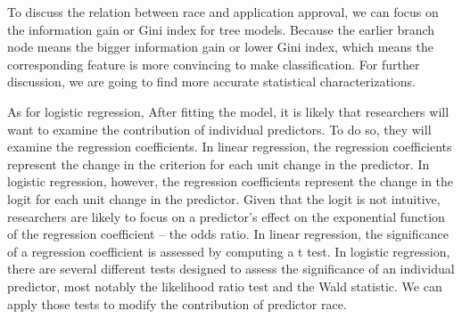 \documentclass[letterpaper, 10 pt, conference]{ieeeconf}  %
\begin{document}
To discuss the relation between race and application approval, we can focus on the information gain or Gini index for tree models. Because the earlier branch node means the bigger information gain or lower Gini index, which means the corresponding feature is more convincing to make classification. For further discussion, we are going to find more accurate statistical characterizations.

As for logistic regression, After fitting the model, it is likely that researchers will want to examine the contribution of individual predictors. To do so, they will examine the regression coefficients. In linear regression, the regression coefficients represent the change in the criterion for each unit change in the predictor. In logistic regression, however, the regression coefficients represent the change in the logit for each unit change in the predictor. Given that the logit is not intuitive, researchers are likely to focus on a predictor's effect on the exponential function of the regression coefficient – the odds ratio. In linear regression, the significance of a regression coefficient is assessed by computing a t test. In logistic regression, there are several different tests designed to assess the significance of an individual predictor, most notably the likelihood ratio test and the Wald statistic. We can apply those tests to modify the contribution of predictor race.
\end{document}
